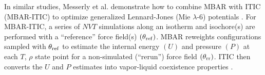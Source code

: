 \documentclass[journal=jced,manuscript=article]{achemso}
\begin{document}

In similar studies, Messerly et al. demonstrate how to combine MBAR with ITIC (MBAR-ITIC) to optimize generalized Lennard-Jones (Mie $\lambda$-6) potentials \cite{Postdoc_1,Postdoc_2}. For MBAR-ITIC, a series of $NVT$ simulations along an isotherm and isochore(s) are performed with a ``reference'' force field(s) $(\theta_{\rm ref})$. MBAR reweights configurations sampled with $\theta_{\rm ref}$ to estimate the internal energy $(U)$ and pressure $(P)$ at each $T$, $\rho$ state point for a non-simulated (``rerun'') force field $(\theta_{\rm rr})$. ITIC then converts the $U$ and $P$ estimates into vapor-liquid coexistence properties \cite{Mostafa_Diss,Mostafa2018}.



\end{document}
